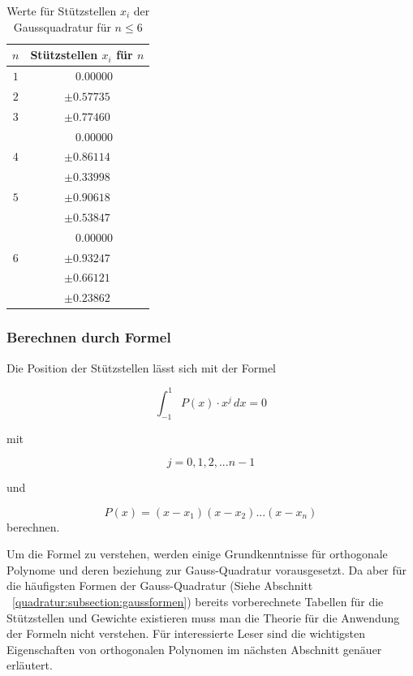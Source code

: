 \begin{table}[h!]
    \centering
    \begin{tabular}{|c|c|}
        \hline
        $n$ & Stützstellen $x_{i}$ für $n$ \\
        \hline
        $1$ & $ \phantom{-} 0.00000 $ \\
        \hline
        $2$ & $ \pm 0.57735 $ \\
        \hline
        $3$ & $ \pm 0.77460 $ \\
            & $ \phantom{-} 0.00000 $ \\
        \hline
        $4$ & $ \pm 0.86114 $ \\
            & $ \pm 0.33998 $ \\
        \hline
        $5$ & $ \pm 0.90618 $ \\
            & $ \pm 0.53847 $ \\
            & $ \phantom{-} 0.00000 $ \\
        \hline
        $6$ & $ \pm 0.93247 $ \\
            & $ \pm 0.66121 $ \\
            & $ \pm 0.23862 $ \\
        \hline
    \end{tabular}
    \caption{Werte für Stützstellen $x_{i}$ der Gaussquadratur für $n \leq 6$
    \label{buch:table:gaussabscissenwerte}}    
\end{table}

\subsubsection{Berechnen durch Formel}
Die Position der Stützstellen lässt sich mit der Formel

\begin{equation*}
    \int_{-1}^{1} P(x) \cdot x^{j} \, dx = 0
\end{equation*}

\noindent
mit

\begin{equation*}
    j = 0, 1, 2, ... n - 1
\end{equation*}

\noindent
und 

\begin{equation}
    P(x) = (x - x_{1})(x - x_{2}) ... (x - x_{n})
\end{equation}
\noindent
berechnen.
\newline

\noindent
Um die Formel zu verstehen, werden einige Grundkenntnisse für 
orthogonale Polynome und deren beziehung zur Gauss-Quadratur vorausgesetzt.
Da aber für die häufigsten Formen der Gauss-Quadratur 
(Siehe Abschnitt ~\ref{quadratur:subsection:gaussformen}) bereits vorberechnete
Tabellen für die Stützstellen und Gewichte existieren muss man die Theorie
für die Anwendung der Formeln nicht verstehen. Für interessierte Leser sind 
die wichtigsten Eigenschaften von orthogonalen Polynomen im nächsten 
Abschnitt genäuer erläutert.
\newpage

